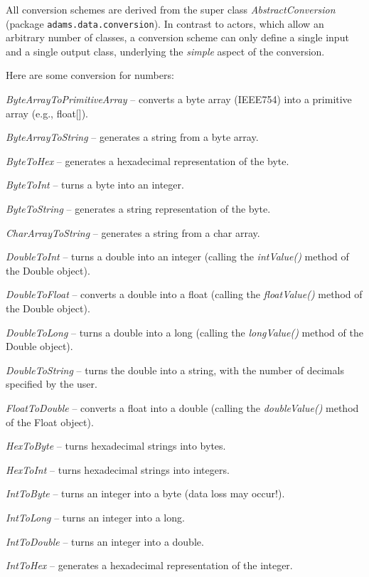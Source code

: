 All conversion schemes are derived from the super class
\textit{AbstractConversion} (package \texttt{adams.data.conversion}).
In contrast to actors, which allow an arbitrary number of classes, a conversion scheme can only define
a single input and a single output class, underlying the \textit{simple} aspect
of the conversion.

Here are some conversion for numbers:
\begin{tight_itemize}
	\item \textit{ByteArrayToPrimitiveArray} -- converts a byte array (IEEE754) into a primitive array (e.g., float[]).
	\item \textit{ByteArrayToString} -- generates a string from a byte array.
	\item \textit{ByteToHex} -- generates a hexadecimal representation of the byte.
	\item \textit{ByteToInt} -- turns a byte into an integer.
	\item \textit{ByteToString} -- generates a string representation of the byte.
  \item \textit{CharArrayToString} -- generates a string from a char array.
	\item \textit{DoubleToInt} -- turns a double into an integer (calling the
	\textit{intValue()} method of the Double object).
	\item \textit{DoubleToFloat} -- converts a double into a float (calling the 
	\textit{floatValue()} method of the Double object).
	\item \textit{DoubleToLong} -- turns a double into a long (calling the
	\textit{longValue()} method of the Double object).
	\item \textit{DoubleToString} -- turns the double into a string, with the number
	of decimals specified by the user.
	\item \textit{FloatToDouble} -- converts a float into a double (calling the 
	\textit{doubleValue()} method of the Float object).
	\item \textit{HexToByte} -- turns hexadecimal strings into bytes.
	\item \textit{HexToInt} -- turns hexadecimal strings into integers.
	\item \textit{IntToByte} -- turns an integer into a byte (data loss may occur!).
	\item \textit{IntToLong} -- turns an integer into a long.
	\item \textit{IntToDouble} -- turns an integer into a double.
	\item \textit{IntToHex} -- generates a hexadecimal representation of the integer.

\end{tight_itemize}
